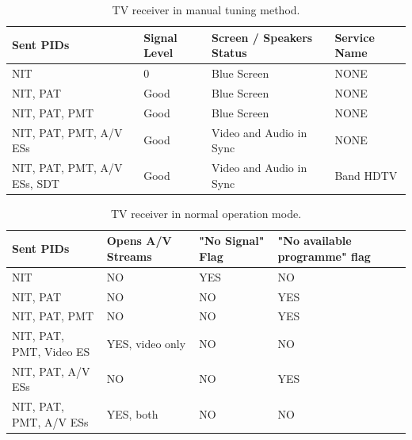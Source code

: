 \documentclass[
	12pt,				%
	openright,			%
	twoside,			%
	a4paper,			%
	brazil,
	french,				%
	english
	]{abntex2}
\begin{document}
\begin{table}
    \caption {TV receiver in manual tuning method.}
    \begin{tabular}{|l|l|l|l|}
    \hline
    Sent PIDs                   & Signal Level & Screen / Speakers Status & Service Name \\ \hline
    NIT                         & 0            & Blue Screen              & NONE         \\ \hline
    NIT, PAT                    & Good         & Blue Screen              & NONE         \\ \hline
    NIT, PAT, PMT               & Good         & Blue Screen              & NONE         \\ \hline
    NIT, PAT, PMT, A/V ESs      & Good         & Video and Audio in Sync  & NONE         \\ \hline
    NIT, PAT, PMT, A/V ESs, SDT & Good         & Video and Audio in Sync  & Band HDTV    \\ \hline
    \end{tabular}
	\label{tab_manual_tuning}

\end{table}

\begin{table}
    \caption {TV receiver in normal operation mode.}
    \begin{tabular}{|l|l|l|l|}
    \hline
    Sent PIDs               & Opens A/V Streams & "No Signal" Flag & "No available programme" flag \\ \hline
    NIT                     & NO                & YES              & NO                            \\ \hline
    NIT, PAT                & NO                & NO               & YES                           \\ \hline
    NIT, PAT, PMT           & NO                & NO               & YES                           \\ \hline
    NIT, PAT, PMT, Video ES & YES, video only   & NO               & NO                            \\ \hline
    NIT, PAT, A/V ESs  & NO         & NO               & YES                            \\ \hline
	NIT, PAT, PMT, A/V ESs  & YES, both         & NO               & NO                            \\ \hline
    \end{tabular}
	\label{tab_normal_operation}
\end{table}
\end{document}
